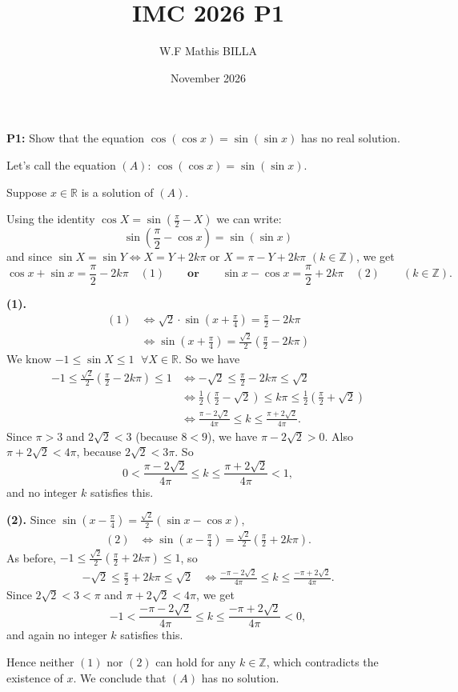 \documentclass{article}
\title{IMC 2026 P1}
\author{W.F Mathis BILLA}
\date{November 2026}
\begin{document}
\maketitle

\textbf{P1:} Show that the equation $\cos(\cos x)=\sin(\sin x)$ has no real solution.



Let's call the equation $(A)$: $\cos(\cos x)=\sin(\sin x)$.

Suppose $x \in \mathbb{R}$ is a solution of $(A)$.

Using the identity $\cos X=\sin\left(\frac{\pi}{2}-X\right)$ we can write:
$$
\sin\left(\frac{\pi}{2}-\cos x\right)=\sin(\sin x)
$$
and since $\sin X=\sin Y \iff X=Y+2k\pi$ or $X=\pi-Y+2k\pi$ $(k \in \mathbb{Z})$, we get
$$
\cos x+\sin x=\frac{\pi}{2}-2k\pi \quad (1)
\qquad \textbf{or} \qquad
\sin x-\cos x=\frac{\pi}{2}+2k\pi \quad (2)
\qquad (k \in \mathbb{Z}).
$$



\textbf{(1).}
\begin{align*}
(1) &\iff \sqrt{2}\cdot\sin\left(x+\frac{\pi}{4}\right)=\frac{\pi}{2}-2k\pi \\
    &\iff \sin\left(x+\frac{\pi}{4}\right)=\frac{\sqrt{2}}{2}\left(\frac{\pi}{2}-2k\pi\right)
\end{align*}
We know $-1\le\sin X\le 1$ $\;\forall X\in\mathbb{R}$. So we have
\begin{align*}
-1 \le \frac{\sqrt{2}}{2}\left(\frac{\pi}{2}-2k\pi\right) \le 1
&\iff -\sqrt{2}\le \frac{\pi}{2}-2k\pi\le\sqrt{2} \\
&\iff \frac{1}{2}\left(\frac{\pi}{2}-\sqrt{2}\right)\le k\pi\le \frac{1}{2}\left(\frac{\pi}{2}+\sqrt{2}\right) \\
&\iff \frac{\pi-2\sqrt{2}}{4\pi}\le k\le\frac{\pi+2\sqrt{2}}{4\pi}.
\end{align*}
Since $\pi>3$ and $2\sqrt{2}<3$ (because $8<9$), we have $\pi-2\sqrt{2}>0$. Also $\pi+2\sqrt{2}<4\pi$, because $2\sqrt{2}<3\pi$. So
$$
0<\frac{\pi-2\sqrt{2}}{4\pi}\le k\le\frac{\pi+2\sqrt{2}}{4\pi}<1,
$$
and no integer $k$ satisfies this.


\textbf{(2).}
Since $\sin\left(x-\frac{\pi}{4}\right)=\frac{\sqrt{2}}{2}(\sin x-\cos x)$,
\begin{align*}
(2) &\iff \sin\left(x-\frac{\pi}{4}\right)=\frac{\sqrt{2}}{2}\left(\frac{\pi}{2}+2k\pi\right).
\end{align*}
As before, $-1\le \frac{\sqrt{2}}{2}\left(\frac{\pi}{2}+2k\pi\right)\le 1$, so
\begin{align*}
-\sqrt{2}\le \frac{\pi}{2}+2k\pi\le\sqrt{2}
&\iff \frac{-\pi-2\sqrt{2}}{4\pi}\le k\le\frac{-\pi+2\sqrt{2}}{4\pi}.
\end{align*}
Since $2\sqrt{2}<3<\pi$ and $\pi+2\sqrt{2}<4\pi$, we get
$$
-1<\frac{-\pi-2\sqrt{2}}{4\pi}\le k\le\frac{-\pi+2\sqrt{2}}{4\pi}<0,
$$
and again no integer $k$ satisfies this.



 Hence neither $(1)$ nor $(2)$ can hold for any $k\in\mathbb{Z}$, which contradicts the existence of $x$. We conclude that $(A)$ has no solution.

\\
\\
\end{document}

